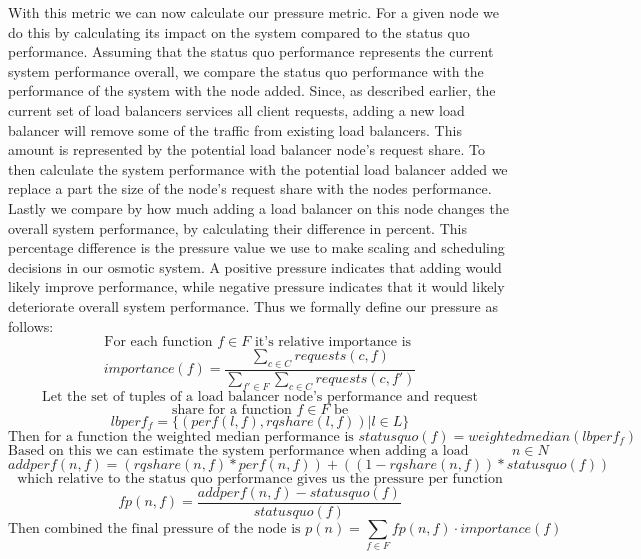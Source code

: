 With this metric we can now calculate our pressure metric. For a given node we do this by calculating its impact on the system compared to the status quo performance.
Assuming that the status quo performance represents the current system performance overall, we compare the status quo performance with the performance of the system with the node added.
Since, as described earlier, the current set of load balancers services all client requests, adding a new load balancer will remove some of the traffic from existing load balancers.
This amount is represented by the potential load balancer node's request share.
To then calculate the system performance with the potential load balancer added we replace a part the size of the node's request share with the nodes performance.
Lastly we compare by how much adding a load balancer on this node changes the overall system performance, by calculating their difference in percent.
This percentage difference is the pressure value we use to make scaling and scheduling decisions in our osmotic system.
A positive pressure indicates that adding would likely improve performance, while negative pressure indicates that it would likely deteriorate overall system performance.
Thus we formally define our pressure as follows:
\[\text{For each function }f \in F \text{ it's relative importance is }\]
\[importance(f) = \frac{\sum_{c \in C}requests(c,f)}{\sum_{f' \in F}\sum_{c \in C}requests(c,f')} \]
\[\text{Let the set of tuples of a load balancer node's performance and request} \]
\[ \text{share for a function }f \in F \text{ be} \]
\[lbperf_{f} = \{(perf(l,f), rqshare(l,f)) | l \in L\} \]
\[\text{Then for a function the weighted median performance is } statusquo(f) = weightedmedian(lbperf_{f})\]
\[\text{Based on this we can estimate the system performance when adding a load balancer on node }n \in N\]
\[ addperf(n,f) = (rqshare(n,f) * perf(n,f)) + ((1 - rqshare(n,f)) * statusquo(f))\]
\[\text{which relative to the status quo performance gives us the pressure per function} \]
\[ fp(n, f) = \frac{addperf(n,f) - statusquo(f)}{statusquo(f)}\]
\[\text{Then combined the final pressure of the node is } p(n) = \sum_{f \in F}fp(n,f) \cdot importance(f)\]

